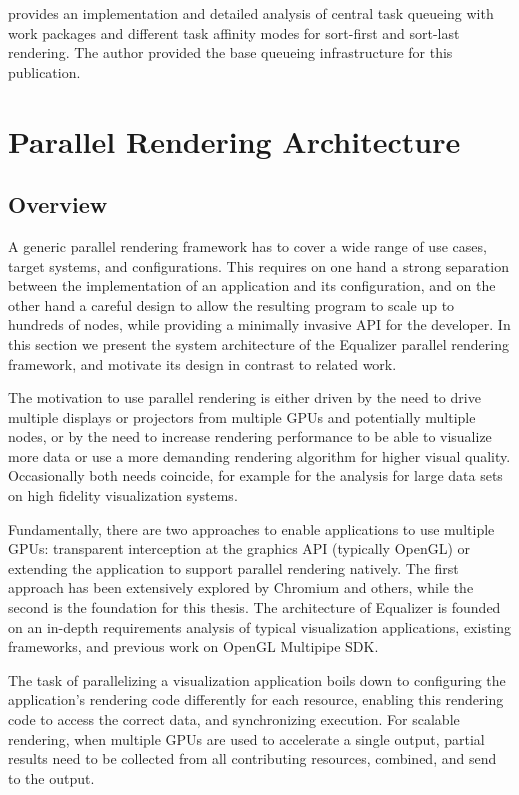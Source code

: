 \cite{SPEP:16} provides an implementation and detailed analysis of central task
queueing with work packages and different task affinity modes for sort-first and
sort-last rendering. The author provided the   base queueing infrastructure for
this publication.

\chapter{Parallel Rendering Architecture}\label{sArchitecture}

\section{Overview}
A generic parallel rendering framework has to cover a wide range of use cases,
target systems, and configurations. This requires on one hand a strong
separation between the implementation of an application and its configuration,
and on the other hand a careful design to allow the resulting program to scale
up to hundreds of nodes, while providing a minimally invasive API for the
developer. In this section we present the system architecture of the Equalizer
parallel rendering framework, and motivate its design in contrast to related
work.

The motivation to use parallel rendering is either driven by the need to drive
multiple displays or projectors from multiple GPUs and potentially multiple
nodes, or by the need to increase rendering performance to be able to visualize
more data or use a more demanding rendering algorithm for higher visual quality.
Occasionally both needs coincide, for example for the analysis for large data
sets on high fidelity visualization systems.

Fundamentally, there are two approaches to enable applications to use multiple
GPUs: transparent interception at the graphics API (typically OpenGL) or
extending the application to support parallel rendering natively. The first
approach has been extensively explored by Chromium and others, while the second
is the foundation for this thesis. The architecture of Equalizer is founded on
an in-depth requirements analysis of typical visualization applications,
existing frameworks, and previous work on OpenGL Multipipe SDK.

The task of parallelizing a visualization application boils down to configuring
the application's rendering code differently for each resource, enabling this
rendering code to access the correct data, and synchronizing execution. For
scalable rendering, when multiple GPUs are used to accelerate a single output,
partial results need to be collected from all contributing resources, combined,
and send to the output.

